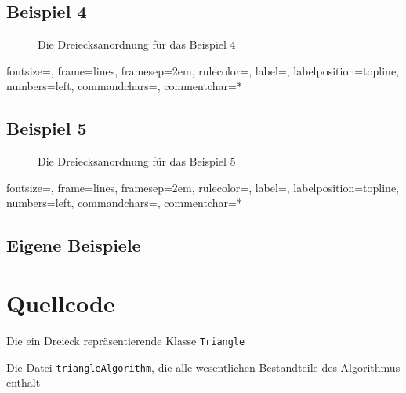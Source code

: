 \documentclass[a4paper, notitlepage, 12pt]{scrartcl}
\newenvironment{longlisting}{\captionsetup{type=listing}}{}
\begin{document}
\subsection{Beispiel 4}
\begin{figure}[H] 
	
	\caption{Die Dreiecksanordnung für das Beispiel 4}
\end{figure}
%
{fontsize=\footnotesize,
	frame=lines,  %
	framesep=2em, %
	rulecolor=\color{Gray},
	label=,
	labelposition=topline,
	numbers=left,
	commandchars=\|\(\), %
	commentchar=*        %
}
\subsection{Beispiel 5}
\begin{figure}[H] 
	
	\caption{Die Dreiecksanordnung für das Beispiel 5}
\end{figure}
%
{fontsize=\footnotesize,
	frame=lines,  %
	framesep=2em, %
	rulecolor=\color{Gray},
	label=,
	labelposition=topline,
	numbers=left,
	commandchars=\|\(\), %
	commentchar=*        %
}
\subsection{Eigene Beispiele}

 \section{Quellcode}
 \renewcommand{\listingscaption}{Quellcode}
 
 \begin{longlisting}
 	
 	\caption{Die ein Dreieck repräsentierende Klasse \texttt{Triangle}}
 	
 	\caption{Die Datei \texttt{triangleAlgorithm}, die alle wesentlichen Bestandteile des Algorithmus enthält}
 \end{longlisting}
 
 
\end{document}
